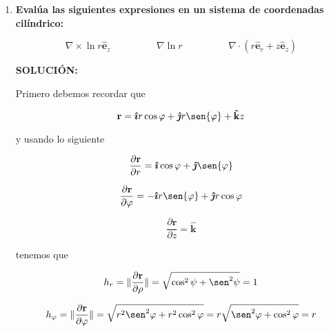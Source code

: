 \documentclass[12pt,a4paper]{article}
\providecommand{\norm}[1]{\lVert#1\rVert}
\begin{document}
\begin{enumerate}
     
     
     
     
     
     \item\textbf{Evalúa las siguientes expresiones en un sistema de coordenadas cilíndrico:}

     \begin{equation*}
         \nabla \times \ln{r} \hat{\mathbf{e}}_z \hspace{2cm} \nabla \ln{r} \hspace{2cm} \nabla \cdot (r \hat{\mathbf{e}}_r + z \hat{\mathbf{e}}_z)
     \end{equation*}
     
     \textbf{SOLUCIÓN:}
     
     Primero debemos recordar que
     
         \begin{equation*}
        \textbf{r} = \boldsymbol{\hat{\imath}} r \cos{\varphi} + \boldsymbol{\hat{\jmath}} r \sen{\varphi} + \mathbf{\hat{k}} z
    \end{equation*}
    
    y usando lo siguiente
    
    \begin{equation*}
        \frac{\partial \textbf{r}}{\partial r} = \boldsymbol{\hat{\imath}} \cos{\varphi} + \boldsymbol{\hat{\jmath}} \sen{\varphi}
    \end{equation*}
    
    \begin{equation*}
        \frac{\partial \textbf{r}}{\partial \varphi} = - \boldsymbol{\hat{\imath}} r \sen{\varphi} + \boldsymbol{\hat{\jmath}} r \cos{\varphi}
    \end{equation*}
    
    \begin{equation*}
        \frac{\partial \textbf{r}}{\partial z} = \mathbf{\hat{k}}
    \end{equation*}
    
    tenemos que
     
    \begin{equation*}
        h_r = \norm{\frac{\partial \textbf{r}}{\partial \rho}} = \sqrt{\cos^2{\psi} + \sen^2{\psi}} = 1
    \end{equation*}
    
    \begin{equation*}
        h_\varphi = \norm{\frac{\partial \textbf{r}}{\partial \varphi}} = \sqrt{r^2 \sen^2{\varphi} + r^2 \cos^2{\varphi}} = r \sqrt{\sen^2{\varphi} + \cos^2{\varphi}} = r
    \end{equation*}
    

\end{enumerate}
\end{document}
